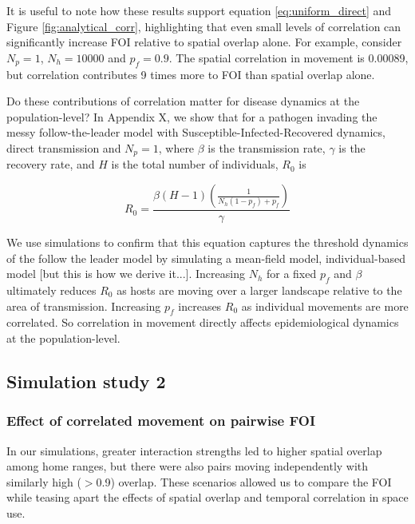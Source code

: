 ﻿\documentclass[11pt]{article}
\begin{document}
It is useful to note how these results support equation \ref{eq:uniform_direct} and Figure \ref{fig:analytical_corr}, highlighting that even small levels of correlation can significantly increase FOI relative to spatial overlap alone. For example, consider $N_p = 1$, $N_h = 10000$ and $p_f = 0.9$.  The spatial correlation in movement is 0.00089, but correlation contributes 9 times more to FOI than spatial overlap alone.

Do these contributions of correlation matter for disease dynamics at the population-level?  In Appendix X, we show that for a pathogen invading the messy follow-the-leader model with Susceptible-Infected-Recovered dynamics, direct transmission and $N_p = 1$, where $\beta$ is the transmission rate, $\gamma$ is the recovery rate, and $H$ is the total number of individuals, $R_0$ is 


$$R_{0} = \dfrac{\beta (H - 1) (\frac{1}{N_h(1 - p_f) + p_f})}{\gamma}$$

We use simulations to confirm that this equation captures the threshold dynamics of the follow the leader model by simulating a mean-field model, individual-based model [but this is how we derive it...]. Increasing $N_h$ for a fixed $p_f$ and $\beta$ ultimately reduces $R_0$ as hosts are moving over a larger landscape relative to the area of transmission. Increasing $p_f$ increases $R_0$ as individual movements are more correlated. So correlation in movement directly affects epidemiological dynamics at the population-level.


\subsection*{Simulation study 2}

\subsubsection*{Effect of correlated movement on pairwise FOI}

In our simulations, greater interaction strengths led to higher spatial overlap among home ranges, but there were also pairs moving independently with similarly high  ($>$0.9) overlap. 
These scenarios allowed us to compare the FOI while teasing apart the effects of spatial overlap and temporal correlation in space use. 
\end{document}
